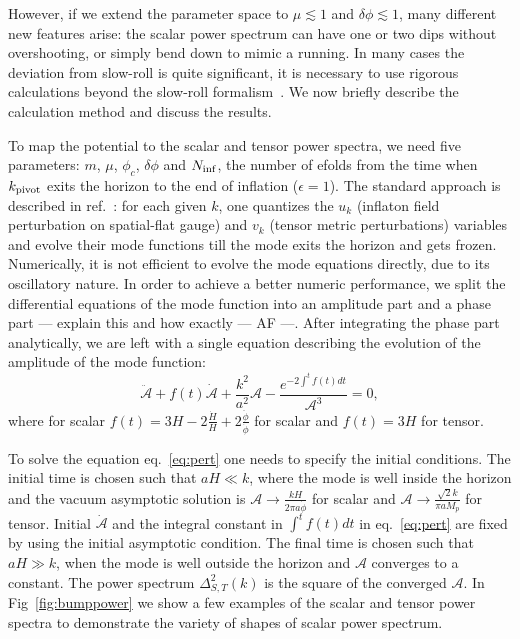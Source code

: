 \documentclass[a4paper,11pt]{article}
\begin{document}
However, if we extend the parameter space to $\mu \lesssim 1$ and $\delta\phi \lesssim 1$, many different new features arise: the scalar power spectrum can have one or two dips without overshooting, or simply bend down to mimic a running. In many cases the deviation from slow-roll is quite significant, it is necessary to use rigorous calculations beyond the slow-roll formalism~\cite{Bardeen1983, Abbott1984,Stewart1993}. We now briefly describe the calculation method and discuss the results.

To map the potential to the scalar and tensor power spectra, we need five parameters: $m$, $\mu$, $\phi_c$, $\delta\phi$ and $N_{\rm inf}$, the number of efolds from the time when $k_{\rm pivot}$ exits the horizon to the end of inflation ($\epsilon = 1$). The standard approach is described in ref.~\cite{Stewart1993}: for each given $k$, one  quantizes the $u_k$ (inflaton field perturbation on spatial-flat gauge) and $v_k$ (tensor metric perturbations) variables and evolve their mode functions till the mode exits the horizon and gets frozen. Numerically, it is not efficient to evolve the mode equations directly, due to its oscillatory nature. In order to achieve a better numeric performance, we split the differential equations of the mode function into an amplitude part and a phase part {\color{red} --- explain this and how exactly --- AF ---}. After integrating the phase part analytically, we are left with a single equation describing the evolution of the amplitude of the mode function:
\begin{equation}
  \ddot{\mathcal{A}} + f(t) \dot{\mathcal{A}} + \frac{k^2}{a^2} \mathcal{A} - \frac{e^{-2\int^t f(t) dt}}{\mathcal{A}^3}  = 0, \label{eq:pert}
\end{equation}
where for scalar $f(t) = 3 H - 2 \frac{\dot H}{H} + 2 \frac{\ddot\phi}{\dot\phi}$ for scalar and $f(t) = 3H$ for tensor. 

To solve the equation eq.~\eqref{eq:pert} one needs to specify the initial conditions. The initial time is chosen such that $aH\ll k$, where the mode is well inside the horizon and the vacuum asymptotic solution is $\mathcal{A} \rightarrow \frac{k H }{2\pi a\dot\phi}$ for scalar and $\mathcal{A} \rightarrow \frac{\sqrt{2}k}{\pi a M_p}$ for tensor.  Initial $\dot{\mathcal{A}}$ and the integral constant in $\int^t f(t) dt$ in eq.~\eqref{eq:pert} are fixed by using the initial asymptotic condition.  The final time is chosen such that $aH\gg k$, when the mode is well outside the horizon and $\mathcal{A}$ converges to a constant.  The power spectrum $\Delta^2_{S,T}(k)$ is the square of the converged $\mathcal{A}$. In Fig~\ref{fig:bumppower} we show a few examples of the scalar and tensor power spectra to demonstrate the variety of shapes of scalar power spectrum. 
\end{document}
